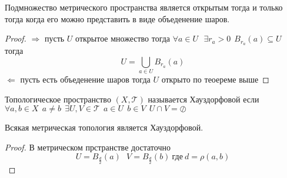 \begin{theorem}
  Подмножество метрического пространства является открытым тогда и только
  тогда когда его можно представить в виде объеденение шаров.
\end{theorem}

\begin{proof}
  $\Rightarrow$ пусть $U$ открытое множество тогда $\forall a \in U ~~~
  \exists r_a > 0 ~~ B_{r_a}(a) \subseteq U$ тогда
  $$
  U = \bigcup_{a \in U} B_{r_a}(a)
  $$
  $\Leftarrow$ пусть есть объеденение шаров тогда $U$ открыто по теоереме выше
\end{proof}

\begin{define}
  Топологическое пространство $(X, \mathcal{T})$ называется Хауздорфовой если
  $\forall a,b \in X ~~ a \not= b ~~ \exists U, V \in \mathcal{T} ~~
  a \in U ~~ b \in V ~~ U \cap V = \oslash$
\end{define}

\begin{theorem}
  Всякая метрическая топология является Хауздорфовой.
\end{theorem}

\begin{proof}
  В метрическом прстранстве достаточно
  $$
  U = B_{\frac{d}{2}}(a) ~~~ V = B_{\frac{d}{2}}(b) ~ \text{где} ~ d = \rho(a,b)
  $$
\end{proof}
